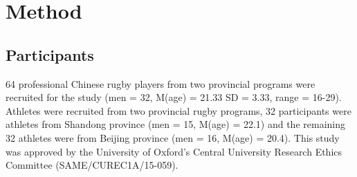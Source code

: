 
















\clearpage
\section{Method}

\subsection{Participants}
64 professional Chinese rugby players from two provincial programs were recruited for the study (men = 32, M(age) = 21.33 SD = 3.33, range = 16-29).  Athletes were recruited from two provincial rugby programs, 32
participants were athletes from Shandong province (men = 15, M(age) = 22.1) and the remaining 32 athletes were from Beijing province (men = 16, M(age) = 20.4).  This study was approved by the University of Oxford’s Central University Research Ethics Committee (SAME/CUREC1A/15-059).


